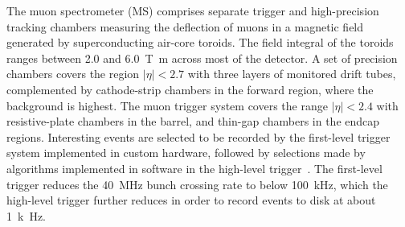 The muon spectrometer (MS) comprises separate trigger and
high-precision tracking chambers measuring the deflection of muons in a magnetic field generated by superconducting air-core toroids.
The field integral of the toroids ranges between \num{2.0} and \SI{6.0}{\tesla\metre}
across most of the detector. 
A set of precision chambers covers the region \(|\eta| < 2.7\) with three layers of monitored drift tubes,
complemented by cathode-strip chambers in the forward region, where the background is highest.
The muon trigger system covers the range \(|\eta| < 2.4\) with resistive-plate chambers in the barrel, and thin-gap chambers in the endcap regions.
Interesting events are selected to be recorded by the first-level trigger system implemented in custom hardware, followed by selections made by algorithms implemented in software in the high-level trigger~\cite{PERF-2011-02}. 
The first-level trigger reduces the 40~MHz bunch crossing rate to below \SI{100}{\kHz}, which the high-level trigger further reduces in order to record events to disk at about \SI{1}{k\Hz}.

